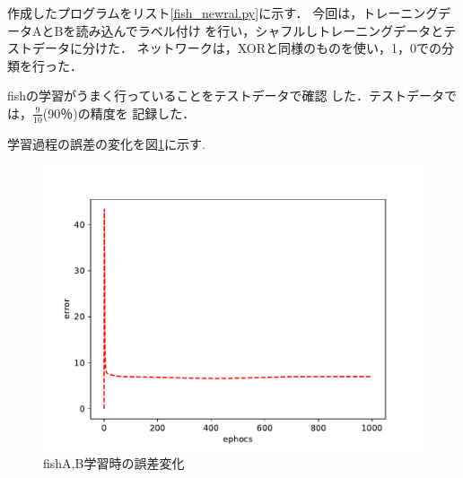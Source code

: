 作成したプログラムをリスト\ref{fish_newral.py}に示す．
今回は，トレーニングデータAとBを読み込んでラベル付け
を行い，シャフルしトレーニングデータとテストデータに分けた．
ネットワークは，XORと同様のものを使い，1，0での分類を行った．

fishの学習がうまく行っていることをテストデータで確認
した．テストデータでは，$\frac{9}{10}$(90％)の精度を
記録した．

学習過程の誤差の変化を図\ref{error-2}に示す.

\begin{figure}[htb]
  \centering
  \includegraphics[scale=0.5]{img/error2.pdf}
  \caption{fishA,B学習時の誤差変化}
  \label{error-2}
\end{figure}
